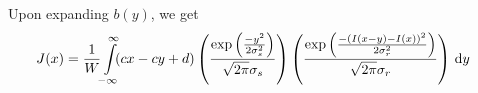 \documentclass[a4paper]{article}
\begin{document}
\begin{enumerate}
Upon expanding $b(y)$, we get
\begin{align*}
J(x) &= \dfrac{1}{W}\int\limits_{\mathclap{-\infty}}^{\mathclap{\infty}}\! (cx - cy + d) \left ( \dfrac{\exp\left (\frac{-y^2}{2\sigma_s^2}\right )}{\sqrt{2\pi}\sigma_s} \right ) \left ( \dfrac{\exp\left (\frac{-(I(x - y) - I(x))^2}{2\sigma_r^2}\right )}{\sqrt{2\pi}\sigma_r} \right ) \, \mathrm{d}y
\end{align*}


\end{enumerate}
\end{document}
